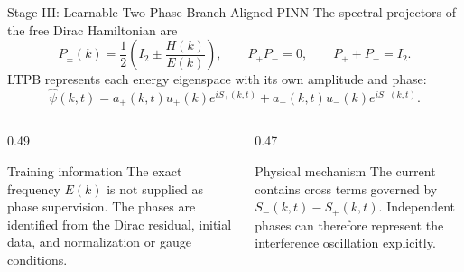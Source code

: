 \documentclass[aspectratio=169,10pt]{beamer}
\begin{document}
\begin{frame}{Stage III: Learnable Two-Phase Branch-Aligned PINN}
The spectral projectors of the free Dirac Hamiltonian are
\begin{equation*}
P_\pm(k)=\frac{1}{2}\left(I_2\pm\frac{H(k)}{E(k)}\right),
\qquad P_+P_-=0,
\qquad P_++P_-=I_2.
\end{equation*}
LTPB represents each energy eigenspace with its own amplitude and phase:
\begin{equation*}
\widehat\psi(k,t)=
a_+(k,t)u_+(k)e^{iS_+(k,t)}+
a_-(k,t)u_-(k)e^{iS_-(k,t)}.
\end{equation*}

\begin{columns}[T,onlytextwidth]
\begin{column}{0.49\textwidth}
\begin{block}{Training information}
The exact frequency \(E(k)\) is not supplied as phase supervision. The phases
are identified from the Dirac residual, initial data, and normalization or
gauge conditions.
\end{block}
\end{column}
\begin{column}{0.47\textwidth}
\begin{block}{Physical mechanism}
The current contains cross terms governed by
\(S_-(k,t)-S_+(k,t)\). Independent phases can therefore represent the
interference oscillation explicitly.
\end{block}
\end{column}
\end{columns}
\end{frame}
\end{document}
